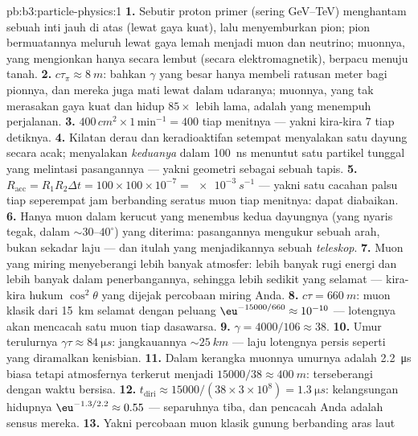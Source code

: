 \begin{solution}{pb:b3:particle-physics:1}
\textbf{1.} Sebutir proton primer (sering \unit{GeV}--\unit{TeV})
menghantam sebuah inti jauh di atas (lewat gaya kuat), lalu menyemburkan pion;
pion bermuatannya meluruh lewat gaya lemah menjadi muon dan neutrino;
muonnya, yang mengionkan hanya secara lembut (secara elektromagnetik), berpacu menuju
tanah.
\textbf{2.} $c\tau_\pi \approx \qty{8}{m}$: bahkan $\gamma$ yang besar
hanya membeli ratusan meter bagi pionnya, dan mereka juga mati lewat
 dalam udaranya; muonnya, yang tak merasakan gaya kuat dan
hidup $85\times$ lebih lama, adalah yang menempuh perjalanan.
\textbf{3.} $400\,\unit{cm^2}\times1\,\text{min}^{-1} = 400$
tiap menitnya --- yakni kira-kira 7 tiap detiknya.
\textbf{4.} Kilatan derau dan keradioaktifan setempat menyalakan satu
dayung secara acak; menyalakan \emph{keduanya} dalam \qty{100}{ns}
menuntut satu partikel tunggal yang melintasi pasangannya --- yakni geometri sebagai
sebuah tapis.
\textbf{5.} $R_{\text{acc}} = R_1R_2\Delta t = 100\times100
\times10^{-7} = \qty{e-3}{s^{-1}}$ --- yakni satu cacahan palsu tiap
seperempat jam berbanding seratus muon tiap menitnya: dapat diabaikan.
\textbf{6.} Hanya muon dalam kerucut yang menembus kedua
dayungnya (yang nyaris tegak, dalam ${\sim}30$--$40^\circ$) yang
diterima: pasangannya mengukur sebuah arah, bukan sekadar laju ---
dan itulah yang menjadikannya sebuah \emph{teleskop}.
\textbf{7.} Muon yang miring menyeberangi lebih banyak atmosfer: lebih banyak rugi
energi dan lebih banyak  dalam penerbangannya, sehingga lebih sedikit yang selamat ---
kira-kira hukum $\cos^2\theta$ yang dijejak percobaan miring Anda.
\textbf{8.} $c\tau = \qty{660}{m}$: muon klasik dari
\qty{15}{km} selamat dengan peluang
$\eu^{-15000/660} \approx 10^{-10}$ --- lotengnya akan mencacah
satu muon tiap dasawarsa.
\textbf{9.} $\gamma = 4000/106 \approx 38$.
\textbf{10.} Umur terulurnya $\gamma\tau \approx
\qty{84}{\micro s}$: jangkauannya ${\sim}\qty{25}{km}$ --- laju
lotengnya persis seperti yang diramalkan kenisbian.
\textbf{11.} Dalam kerangka muonnya umurnya adalah \qty{2.2}{\micro s}
biasa tetapi atmosfernya terkerut menjadi
$15000/38 \approx \qty{400}{m}$: terseberangi dengan waktu bersisa.
\textbf{12.} $t_{\text{diri}} \approx 15000/(38\times3\times
10^8) = \qty{1.3}{\micro s}$: kelangsungan hidupnya $\eu^{-1.3/2.2} \approx
0.55$ --- separuhnya tiba, dan pencacah Anda adalah sensus mereka.
\textbf{13.} Yakni percobaan muon klasik gunung berbanding aras laut

\end{solution}
